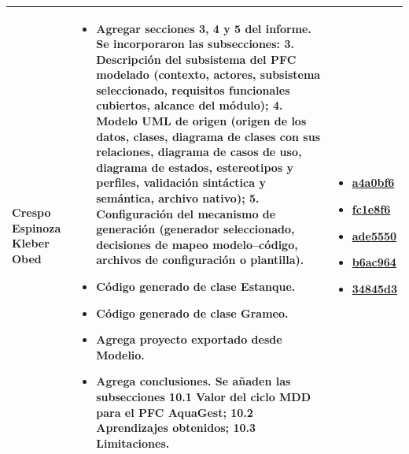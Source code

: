 \documentclass[11pt,a4paper]{article}
\begin{document}
\begin{tabularx}{\textwidth}{
>{\raggedright\arraybackslash}p{}
>{\raggedright\arraybackslash}X
>{\raggedright\arraybackslash}p{}
}
Crespo Espinoza Kleber Obed &
\begin{itemize}[leftmargin=*,nosep,itemsep=2pt]
    \item \textbf{Agregar secciones 3, 4 y 5 del informe.} Se incorporaron las subsecciones: 3. Descripción del subsistema del PFC modelado (contexto, actores, subsistema seleccionado, requisitos funcionales cubiertos, alcance del módulo); 4. Modelo UML de origen (origen de los datos, clases, diagrama de clases con sus relaciones, diagrama de casos de uso, diagrama de estados, estereotipos y perfiles, validación sintáctica y semántica, archivo nativo); 5. Configuración del mecanismo de generación (generador seleccionado, decisiones de mapeo modelo--código, archivos de configuración o plantilla).
    \item \textbf{Código generado de clase Estanque.}
    \item \textbf{Código generado de clase Grameo.}
    \item \textbf{Agrega proyecto exportado desde Modelio.}
    \item \textbf{Agrega conclusiones.} Se añaden las subsecciones 10.1 Valor del ciclo MDD para el PFC AquaGest; 10.2 Aprendizajes obtenidos; 10.3 Limitaciones.
    
\end{itemize} &
\begin{itemize}[leftmargin=*,nosep,itemsep=2pt]
    \item \href{https://github.com/erizzov-boop/PFC-AquaGest-MDD-Equipo_D-/commit/a4a0bf6ff8b658e6f0d7d01a9128421c529fd1d2}{a4a0bf6}
    \item \href{https://github.com/erizzov-boop/PFC-AquaGest-MDD-Equipo_D-/commit/fc1e8f6ff10e38bdcaa99779135dcf219c0f6b7d}{fc1e8f6}
    \item \href{https://github.com/erizzov-boop/PFC-AquaGest-MDD-Equipo_D-/commit/ade5550524638a1ac49a4ffe7a938a1661368262}{ade5550}
    \item \href{https://github.com/erizzov-boop/PFC-AquaGest-MDD-Equipo_D-/commit/b6ac964680bba44dc6c075c1e8dca8900d95ab84}{b6ac964}
    \item \href{https://github.com/erizzov-boop/PFC-AquaGest-MDD-Equipo_D-/commit/34845d35ca3f3a1a1ebe81cd3643d88c017e6e39}{34845d3}
\end{itemize} \\

\midrule


\end{tabularx}
\end{document}
